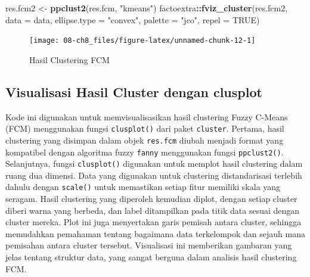 \documentclass[
  oneside]{book}
\newenvironment{Shaded}{\begin{snugshade}}{\end{snugshade}}
\newcommand{\AttributeTok}[1]{\textcolor[rgb]{0.13,0.29,0.53}{#1}}
\newcommand{\ConstantTok}[1]{\textcolor[rgb]{0.56,0.35,0.01}{#1}}
\newcommand{\FunctionTok}[1]{\textcolor[rgb]{0.13,0.29,0.53}{\textbf{#1}}}
\newcommand{\NormalTok}[1]{#1}
\newcommand{\OtherTok}[1]{\textcolor[rgb]{0.56,0.35,0.01}{#1}}
\newcommand{\SpecialCharTok}[1]{\textcolor[rgb]{0.81,0.36,0.00}{\textbf{#1}}}
\newcommand{\StringTok}[1]{\textcolor[rgb]{0.31,0.60,0.02}{#1}}
\begin{document}
\begin{Shaded}
\begin{Highlighting}[]
\NormalTok{res.fcm2 }\OtherTok{\textless{}{-}} \FunctionTok{ppclust2}\NormalTok{(res.fcm, }\StringTok{"kmeans"}\NormalTok{)}
\NormalTok{factoextra}\SpecialCharTok{::}\FunctionTok{fviz\_cluster}\NormalTok{(res.fcm2, }\AttributeTok{data =}\NormalTok{ data, }
  \AttributeTok{ellipse.type =} \StringTok{"convex"}\NormalTok{,}
  \AttributeTok{palette =} \StringTok{"jco"}\NormalTok{,}
  \AttributeTok{repel =} \ConstantTok{TRUE}\NormalTok{)}
\end{Highlighting}
\end{Shaded}

\begin{figure}[h]

{\centering \texttt{[image: 08-ch8\_files/figure-latex/unnamed-chunk-12-1]} 

}

\caption{Hasil Clustering FCM}\label{fig:unnamed-chunk-12}
\end{figure}

\subsection*{Visualisasi Hasil Cluster dengan clusplot}\label{visualisasi-hasil-cluster-dengan-clusplot}

Kode ini digunakan untuk memvisualisasikan hasil clustering Fuzzy C-Means (FCM) menggunakan fungsi \texttt{clusplot()} dari paket \texttt{cluster}. Pertama, hasil clustering yang disimpan dalam objek \texttt{res.fcm} diubah menjadi format yang kompatibel dengan algoritma fuzzy \texttt{fanny} menggunakan fungsi \texttt{ppclust2()}. Selanjutnya, fungsi \texttt{clusplot()} digunakan untuk memplot hasil clustering dalam ruang dua dimensi. Data yang digunakan untuk clustering distandarisasi terlebih dahulu dengan \texttt{scale()} untuk memastikan setiap fitur memiliki skala yang seragam. Hasil clustering yang diperoleh kemudian diplot, dengan setiap cluster diberi warna yang berbeda, dan label ditampilkan pada titik data sesuai dengan cluster mereka. Plot ini juga menyertakan garis pemisah antara cluster, sehingga memudahkan pemahaman tentang bagaimana data terkelompok dan sejauh mana pemisahan antara cluster tersebut. Visualisasi ini memberikan gambaran yang jelas tentang struktur data, yang sangat berguna dalam analisis hasil clustering FCM.
\end{document}
